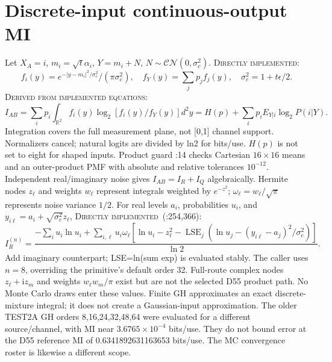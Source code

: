 \documentclass[11pt]{article}
\newcommand{\src}[2]{\texttt{\detokenize{#1}}:#2}
\newcommand{\DI}{\textsc{Directly implemented}}
\newcommand{\DE}{\textsc{Derived from implemented equations}}
\newcommand{\LSE}{\operatorname{LSE}}
\begin{document}
\section{Discrete-input continuous-output MI}
Let $X_A=i$, $m_i=\sqrt t\alpha_i$, $Y=m_i+N$, $N\sim\mathcal{CN}(0,\sigma_c^2)$.
\DI:
\begin{equation}
f_i(y)=e^{-|y-m_i|^2/\sigma_c^2}/(\pi\sigma_c^2),\quad
f_Y(y)=\sum_jp_jf_j(y),\quad \sigma_c^2=1+t\epsilon/2.
\end{equation}
\DE:
\begin{equation}
I_{AB}=\sum_i p_i\int_{\mathbb R^2}f_i(y)\log_2[f_i(y)/f_Y(y)]d^2y
=H(p)+\sum_i p_iE_{Y|i}\log_2P(i|Y).
\end{equation}
Integration covers the full measurement plane, not [0,1] channel support.
Normalizers cancel; natural logits are divided by ln2 for bits/use.
$H(p)$ is not set to eight for shaped inputs.
Product guard \src{src/cvqkd/mutual_information.py}{14}
checks Cartesian $16\times16$ means and an outer-product PMF with
absolute and relative tolerances $10^{-12}$.
Independent real/imaginary noise gives $I_{AB}=I_R+I_Q$ algebraically.
Hermite nodes $z_\ell$ and weights $w_\ell$ represent integrals weighted by $e^{-z^2}$;
$\omega_\ell=w_\ell/\sqrt\pi$ represents noise variance $1/2$.
For real levels $a_i$, probabilities $u_i$, and
$y_{i\ell}=a_i+\sqrt{\sigma_c^2}z_\ell$, \DI\ (:254,366):
\begin{equation}
I_R^{(n)}=\frac{-\sum_i u_i\ln u_i+
\sum_{i,\ell}u_i\omega_\ell[\ln u_i-z_\ell^2-
\LSE_j(\ln u_j-(y_{i\ell}-a_j)^2/\sigma_c^2)]}{\ln2}.
\end{equation}
Add imaginary counterpart; LSE=ln(sum exp) is evaluated stably.
The caller uses $n=8$, overriding the primitive's default order 32.
Full-route complex nodes $z_\ell+\mathrm iz_m$ and weights $w_\ell w_m/\pi$ exist but are
not the selected D55 product path. No Monte Carlo draws enter these values.
Finite GH approximates an exact discrete-mixture integral; it does not create
a Gaussian-input approximation.
The older TEST2A GH orders 8,16,24,32,48,64 were evaluated for a different
source/channel, with MI near $3.6765\times10^{-4}$ bits/use.
They do not bound error at the D55 reference MI of 0.6341892631163653 bits/use.
The MC convergence roster is likewise a different scope.
\end{document}
